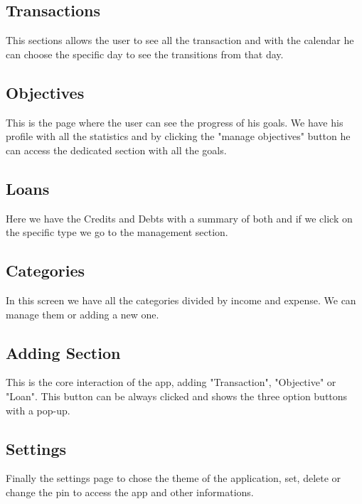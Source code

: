 \documentclass[a4paper,12pt]{article}
\begin{document}
\subsection{Transactions}
This sections allows the user to see all the transaction and with the calendar he can choose the specific day to see the transitions from that day.
\subsection{Objectives}
This is the page where the user can see the progress of his goals. We have his profile with all the statistics and by clicking the "manage objectives" button he can access the dedicated section with all the goals.
\subsection{Loans}
Here we have the Credits and Debts with a summary of both and if we click on the specific type we go to the management section.
\subsection{Categories}
In this screen we have all the categories divided by income and expense. We can manage them or adding a new one.
\subsection{Adding Section}
This is the core interaction of the app, adding "Transaction", "Objective" or "Loan". This button can be always clicked and shows the three option buttons with a pop-up.
\subsection{Settings}
Finally the settings page to chose the theme of the application, set, delete or change the pin to access the app and other informations.
\end{document}
